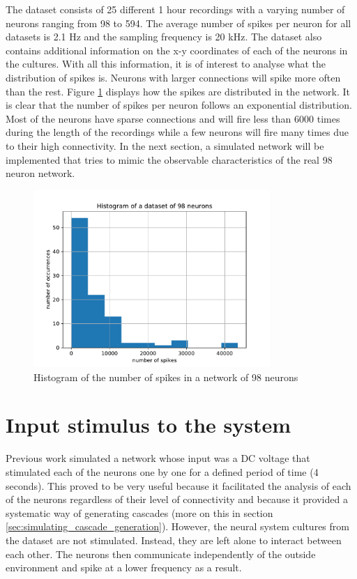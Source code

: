 The dataset consists of 25 different 1 hour recordings with a varying number of neurons ranging from 98 to 594. The average number of spikes per neuron for all datasets is 2.1 Hz and the sampling frequency is 20 kHz. The dataset also contains additional information on the x-y coordinates of each of the neurons in the cultures. With all this information, it is of interest to analyse what the distribution of spikes is. Neurons with larger connections will spike more often than the rest. Figure \ref{fig:histogram_spikes} displays how the spikes are distributed in the network. It is clear that the number of spikes per neuron follows an exponential distribution. Most of the neurons have sparse connections and will fire less than 6000 times during the length of the recordings while a few neurons will fire many times due to their high connectivity. In the next section, a simulated network will be implemented that tries to mimic the observable characteristics of the real 98 neuron network.\\

\begin{figure}[H]
	\centering
	\includegraphics[width=0.8\textwidth]{histogram_number_spikes_dataset.pdf}
	\caption{Histogram of the number of spikes in a network of 98 neurons}
	\label{fig:histogram_spikes}
\end{figure}

\section{Input stimulus to the system}\label{sec:input_stimulus}

Previous work \cite{alexandru2018estimating} simulated a network whose input was a DC voltage that stimulated each of the neurons one by one for a defined period of time (4 seconds). This proved to be very useful because it facilitated the analysis of each of the neurons regardless of their level of connectivity and because it provided a systematic way of generating cascades (more on this in section \ref{sec:simulating_cascade_generation}).
However, the neural system cultures from the dataset are not stimulated. Instead, they are left alone to interact between each other. The neurons then communicate independently of the outside environment and spike at a lower frequency as a result. \\

